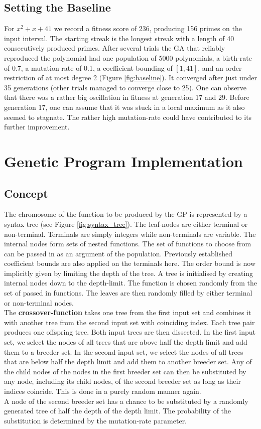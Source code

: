 \documentclass[11pt,a4paper]{article}
\begin{document}
\subsection*{Setting the Baseline}
For $x^2+x+41$ we record a fitness score of 236, producing 156 primes on the input interval. The starting streak is the longest streak with a length of 40 consecutively produced primes. After several trials the GA that reliably reproduced the polynomial had one population of 5000 polynomials, a birth-rate of 0.7, a mutation-rate of 0.1, a coefficient bounding of $[1, 41]$, and an order restriction of at most degree 2 (Figure \ref{fig:baseline}). It converged after just under 35 generations (other trials managed to converge close to 25). One can observe that there was a rather big oscillation in fitness at generation 17 and 29. Before generation 17, one can assume that it was stuck in a local maximum as it also seemed to stagnate. The rather high mutation-rate could have contributed to its further improvement.
\section*{Genetic Program Implementation}
\subsection*{Concept}
The chromosome of the function to be produced by the GP is represented by a syntax tree (see Figure \ref{fig:syntax_tree}). The leaf-nodes are either terminal or non-terminal. Terminals are simply integers while non-terminals are variable. The internal nodes form sets of nested functions. The set of functions to choose from can be passed in as an argument of the population. Previously established coefficient bounds are also applied on the terminals here. The order bound is now implicitly given by limiting the depth of the tree. A tree is initialised by creating internal nodes down to the depth-limit. The function is chosen randomly from the set of passed in functions. The leaves are then randomly filled by either terminal or non-terminal nodes. \\
The {\bf crossover-function} takes one tree from the first input set and combines it with another tree from the second input set with coinciding index. Each tree pair produces one offspring tree. Both input trees are then dissected. In the first input set, we select the nodes of all trees that are above half the depth limit and add them to a breeder set. In the second input set, we select the nodes of all trees that are below half the depth limit and add them to another breeder set. Any of the child nodes of the nodes in the first breeder set can then be substituted by any node, including its child nodes, of the second breeder set as long as their indices coincide. This is done in a purely random manner again. \\
A node of the second breeder set has a chance to be substituted by a randomly generated tree of half the depth of the depth limit. The probability of the substitution is determined by the mutation-rate parameter.
\end{document}
